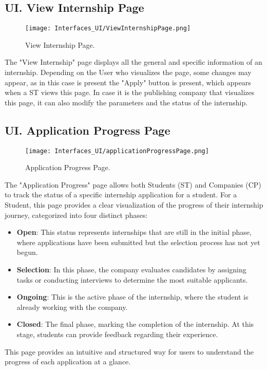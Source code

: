 \subsection*{UI\cui . View Internship Page}

\begin{figure}[H]
    \begin{center}
        \texttt{[image: Interfaces\_UI/ViewInternshipPage.png]}
        \caption{View Internship Page.}
        \label{fig:view_internship_page}%
    \end{center}
\end{figure}

The "View Internship" page displays all the general and specific information of an internship. Depending on the User who visualizes the page, some changes may appear, as in this case is present the "Apply" button is present, which appears when a ST views this page. In case it is the publishing company that visualizes this page, it can also modify the parameters and the status of the internship.

\subsection*{UI\cui . Application Progress Page}

\begin{figure}[H]
    \begin{center}
        \texttt{[image: Interfaces\_UI/applicationProgressPage.png]}
        \caption{Application Progress Page.}
        \label{fig:application_progress_page}%
    \end{center}   
\end{figure}

The "Application Progress" page allows both Students (ST) and Companies (CP) to track the status of a specific internship application for a student. For a Student, this page provides a clear visualization of the progress of their internship journey, categorized into four distinct phases:

\begin{itemize}
    \item \textbf{Open}: This status represents internships that are still in the initial phase, where applications have been submitted but the selection process has not yet begun.
    \item \textbf{Selection}: In this phase, the company evaluates candidates by assigning tasks or conducting interviews to determine the most suitable applicants.
    \item \textbf{Ongoing}: This is the active phase of the internship, where the student is already working with the company.
    \item \textbf{Closed}: The final phase, marking the completion of the internship. At this stage, students can provide feedback regarding their experience.
\end{itemize}
This page provides an intuitive and structured way for users to understand the progress of each application at a glance.





